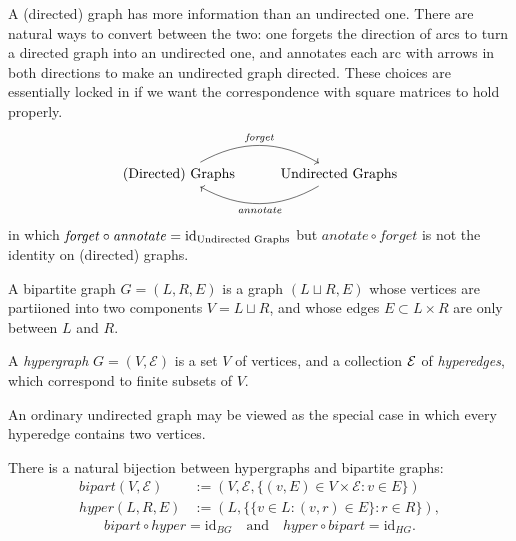 A (directed) graph has more information than an undirected one.
There are natural ways to convert between the two: one forgets the direction of arcs to turn a directed graph into an undirected one, and annotates each arc with arrows in both directions to make an undirected graph directed. These choices are essentially locked in if we want the correspondence with square matrices to hold properly. 
\[ 
\begin{tikzcd}
\text{(Directed) Graphs} \ar[r,bend left,"\mathit{forget}"]&
\text{Undirected Graphs}
\ar[l,bend left,"\mathit{annotate}"]
\end{tikzcd}
\]
in which
$\mathit{forget} \circ \mathit{annotate} = \operatorname{\mathrm{id}}_{\text{Undirected Graphs}}$
but
$\mathit{anotate} \circ \mathit{forget}$ is not the identity on (directed) graphs.

\begin{defn}
    A bipartite graph $G = (L, R, E)$ is a graph $(L \sqcup R, E)$ whose
    vertices are partiioned into two components $V = L \sqcup R$, 
    and whose edges $E \subset L \times R$ are only between $L$ and $R$. 
\end{defn}




\begin{defn}
    A \emph{hypergraph} $G = (V, \mathcal E)$ is a set $V$ of vertices,
    and a collection $\mathcal E$ of \emph{hyperedges}, which correspond to finite
    subsets of $V$. 
\end{defn}

An ordinary undirected graph may be viewed as the special case in which every hyperedge contains  two vertices.

\begin{prop} 
There is a natural bijection between hypergraphs and bipartite graphs:
\def\bigr{\mathit{bipart}}
\def\hygr{\mathit{hyper}}
\begin{align*}
    \bigr(V, \mathcal E) &:=  (V, \mathcal E, \{(v, E) \in V \times \mathcal E : v \in E \} ) \\
    \hygr(L, R, E) &:= (L, \{\{v \in L : (v,r) \in E\} : r \in R\}),
\end{align*}    
    \[
        \bigr \circ \hygr = \mathrm{id}_{BG}
        \quad\text{and}\quad
        \hygr \circ \bigr = \mathrm{id}_{HG}.
    \]
\end{prop}

